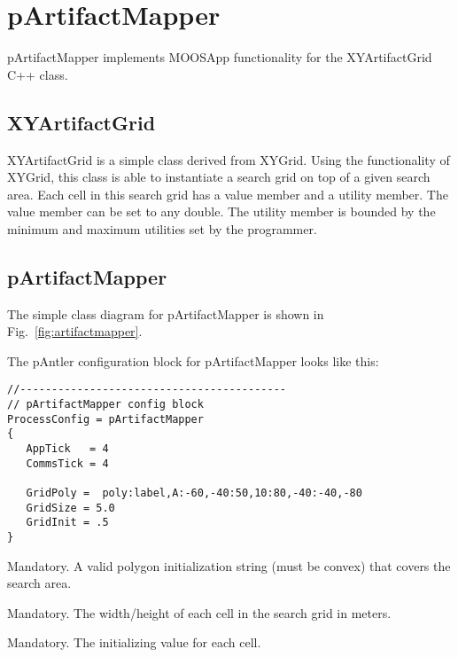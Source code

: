 \section{pArtifactMapper}
\label{pArtifactMapper}

pArtifactMapper implements MOOSApp functionality for the XYArtifactGrid C++ class.

\subsection{XYArtifactGrid}
\label{XYArtifactGrid}

XYArtifactGrid is a simple class derived from XYGrid.  Using the functionality of XYGrid, this class is able to instantiate a search grid on top of a given search area.  Each cell in this search grid has a value member and a utility member.  The value member can be set to any double.  The utility member is bounded by the minimum and maximum utilities set by the programmer.

\subsection{pArtifactMapper}
The simple class diagram for pArtifactMapper is shown in Fig.~\ref{fig:artifactmapper}.


The pAntler configuration block for pArtifactMapper looks like this:
\scriptsize
\begin{verbatim}
//------------------------------------------
// pArtifactMapper config block
ProcessConfig = pArtifactMapper
{
   AppTick   = 4
   CommsTick = 4
   
   GridPoly =  poly:label,A:-60,-40:50,10:80,-40:-40,-80
   GridSize = 5.0
   GridInit = .5
}
\end{verbatim}
\normalsize

\begin{hangpar}{\pin}{}
Mandatory. A valid polygon initialization string (must be convex) that covers the search area.
\end{hangpar}

\begin{hangpar}{\pin}{}
Mandatory. The width/height of each cell in the search grid in meters.
\end{hangpar}

\begin{hangpar}{\pin}{}
Mandatory. The initializing value for each cell.
\end{hangpar}
